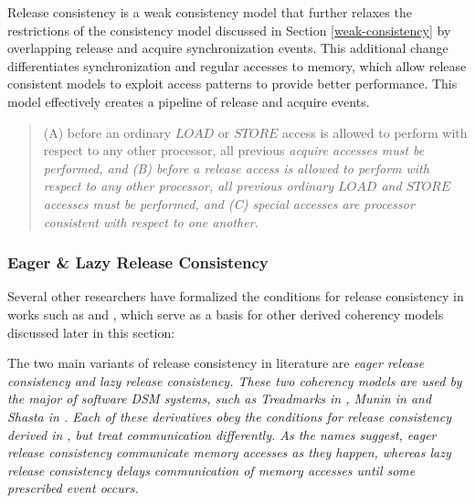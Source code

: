 \documentclass[10pt,conference]{IEEEtran}
\begin{document}
Release consistency is a weak consistency model that further relaxes the restrictions of the consistency model discussed in Section \ref{weak-consistency} by overlapping release and acquire synchronization events.  This additional change differentiates synchronization and regular accesses to memory, which allow release consistent models to exploit access patterns to provide better performance.  This model effectively creates a pipeline of release and acquire events.

\begin{quote}
\begin{condition}
(A) before an ordinary $LOAD$ or $STORE$ access is allowed to perform with respect to any other processor, all previous \em acquire \em accesses must be performed, and (B) before a \em release \em access is allowed to perform with respect to any other processor, all previous ordinary $LOAD$ and $STORE$ accesses must be performed, and (C) \em special accesses \em are processor consistent with respect to one another.
\end{condition}
\end{quote}

\subsubsection{Eager \& Lazy Release Consistency}

Several other researchers have formalized the conditions for release consistency in works such as \cite{Gharachorloo:1990:MCE:325164.325102} and \cite{Keleher:1992:LRC:139669.139676}, which serve as a basis for other derived coherency models discussed later in this section:

The two main variants of release consistency in literature are \em eager release consistency \em and \em lazy release consistency\em.  These two coherency models are used by the major of software DSM systems, such as Treadmarks in \cite{Amza:1996:TSM:226705.226708,Keleher:1994:TDS:1267074.1267084}, Munin in \cite{Keleher:1992:LRC:139669.139676, Bennett:1990:MDS:99163.99182, Carter:1991:IPM:121132.121159, Zwaenepoel:1992:MDS:134397.135235} and Shasta in \cite{Scales:1996:SLO:237090.237179}.  Each of these derivatives obey the conditions for release consistency derived in \cite{Gharachorloo:1990:MCE:325164.325102}, but treat communication differently.  As the names suggest, \em eager release consistency \em communicate memory accesses as they happen, whereas \em lazy release consistency \em delays communication of memory accesses until some prescribed event occurs.
\end{document}
